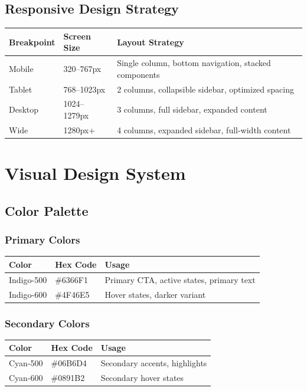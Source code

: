 \documentclass{report}
\begin{document}
\section{Responsive Design Strategy}

\begin{table}[h]
\centering
\begin{tabular}{|l|l|l|}
\hline
\textbf{Breakpoint} & \textbf{Screen Size} & \textbf{Layout Strategy} \\
\hline
Mobile & 320–767px & Single column, bottom navigation, stacked components \\
\hline
Tablet & 768–1023px & 2 columns, collapsible sidebar, optimized spacing \\
\hline
Desktop & 1024–1279px & 3 columns, full sidebar, expanded content \\
\hline
Wide & 1280px+ & 4 columns, expanded sidebar, full-width content \\
\hline
\end{tabular}
\end{table}

\chapter{Visual Design System}

\section{Color Palette}

\subsection{Primary Colors}
\begin{table}[h]
\centering
\begin{tabular}{|l|l|l|}
\hline
\textbf{Color} & \textbf{Hex Code} & \textbf{Usage} \\
\hline
Indigo-500 & \#6366F1 & Primary CTA, active states, primary text \\
\hline
Indigo-600 & \#4F46E5 & Hover states, darker variant \\
\hline
\end{tabular}
\end{table}

\subsection{Secondary Colors}
\begin{table}[h]
\centering
\begin{tabular}{|l|l|l|}
\hline
\textbf{Color} & \textbf{Hex Code} & \textbf{Usage} \\
\hline
Cyan-500 & \#06B6D4 & Secondary accents, highlights \\
\hline
Cyan-600 & \#0891B2 & Secondary hover states \\
\hline
\end{tabular}
\end{table}
\end{document}
